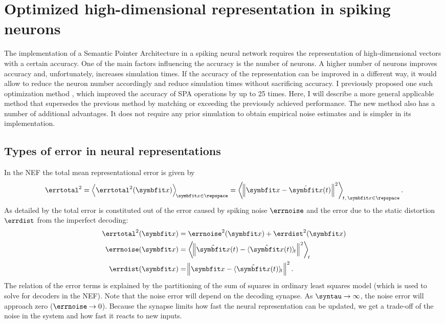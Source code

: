 \chapter{Optimized high-dimensional representation in spiking neurons}\label{sec:hdrep}
The implementation of a Semantic Pointer Architecture in a spiking neural network requires the representation of high-dimensional vectors with a certain accuracy.
One of the main factors influencing the accuracy is the number of neurons.
A higher number of neurons improves accuracy and, unfortunately, increases simulation times.
If the accuracy of the representation can be improved in a different way, it would allow to reduce the neuron number accordingly and reduce simulation times without sacrificing accuracy.
I previously proposed one such optimization method \parencite{gosmann216}, which improved the accuracy of SPA operations by up to 25 times.
Here, I will describe a more general applicable method that supersedes the previous method by matching or exceeding the previously achieved performance.
The new method also has a number of additional advantages.
It does not require any prior simulation to obtain empirical noise estimates and is simpler in its implementation.

\section{Types of error in neural representations}
In the NEF the total mean representational error is given by
\begin{equation}
    \errtotal^2 = \left\langle \errtotal^2(\vc x) \right\rangle_{\!\vc x \in \repspace} = \left\langle \norm{\vc x - \hat{\vc x}(t)}^2 \right\rangle_{\!t,\,\vc x \in \repspace} \text{.}
\end{equation}
As detailed by \textcite[47--48]{eliasmith2003} the total error is constituted out of the error caused by spiking noise $\errnoise$ and the error due to the static distortion $\errdist$ from the imperfect decoding:
\begin{align}
    \errtotal^2(\vc x) &= \errnoise^2(\vc x) + \errdist^2(\vc x) \\
    \errnoise(\vc x) &= \left\langle \norm{\hat{\vc x}(t) - \langle \hat{\vc x}(t) \rangle_{\!t}}^2 \right\rangle_{\!t} \\
    \errdist(\vc x) &= \norm{\vc x - \langle \hat{\vc x}(t) \rangle_{\!t}}^2 \text{.}
\end{align}
The relation of the error terms is explained by the partitioning of the sum of squares in ordinary least squares model (which is used to solve for decoders in the NEF).
Note that the noise error will depend on the decoding synapse.
As $\syntau \rightarrow \infty$, the noise error will approach zero ($\errnoise \rightarrow 0$).
Because the synapse limits how fast the neural representation can be updated, we get a trade-off of the noise in the system and how fast it reacts to new inputs.

